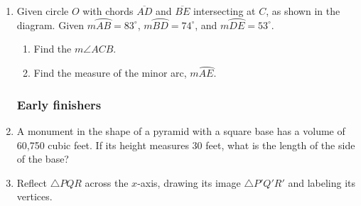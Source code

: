 \documentclass[12pt, twoside]{article}
\begin{document}
\begin{enumerate}
    \item Given circle $O$ with chords $\overline{AD}$ and $\overline{BE}$ intersecting at $C$, as shown in the diagram. Given $m \wideparen{AB}=83^\circ$, $m \wideparen{BD}=74^\circ$, and $m \wideparen{DE}=53^\circ$.
      \begin{multicols}{2}
       \raggedcolumns
       \begin{enumerate}
         \item Find the $m\angle ACB$. \vspace{3.5cm}
         \item Find the measure of the minor arc, $m\wideparen{AE}$. \vspace{2cm}
       \end{enumerate}
      \end{multicols}  \vspace{2cm}

\newpage
\subsubsection*{Early finishers}

  \item A monument in the shape of a pyramid with a square base has a volume of 60,750 cubic feet. If its height measures 30 feet, what is the length of the side of the base? \vspace{4cm}

  \item Reflect $\triangle PQR$ across the $x$-axis, drawing its image $\triangle P'Q'R'$ and labeling its vertices.
    \begin{center}
    \end{center}



\end{enumerate}
\end{document}
